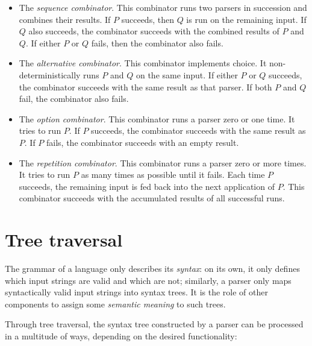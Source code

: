 \documentclass[UdineBachThesis,american,11pt]{PhdThesis}
\begin{document}
  \begin{itemize}
    \item The \emph{sequence combinator}. This combinator runs two parsers in
    succession and combines their results. If $P$ succeeds, then $Q$ is run on
    the remaining input. If $Q$ also succeeds, the combinator succeeds with the
    combined results of $P$ and $Q$\@. If either $P$ or $Q$ fails, then the
    combinator also fails.

    \item The \emph{alternative combinator}. This combinator implements choice.
    It non-deterministically runs $P$ and $Q$ on the same input. If either $P$
    or $Q$ succeeds, the combinator succeeds with the same result as that
    parser. If both $P$ and $Q$ fail, the combinator also fails.

    \item The \emph{option combinator}. This combinator runs a parser zero or
    one time. It tries to run $P$\@. If $P$ succeeds, the combinator succeeds
    with the same result as $P$\@. If $P$ fails, the combinator succeeds with an
    empty result.

    \item The \emph{repetition combinator}. This combinator runs a parser zero
    or more times. It tries to run $P$ as many times as possible until it fails.
    Each time $P$ succeeds, the remaining input is fed back into the next
    application of $P$\@. This combinator succeeds with the accumulated results
    of all successful runs.
  \end{itemize}

  \newpage

  \section{Tree traversal}

  The grammar of a language only describes its \emph{syntax}: on its own, it
  only defines which input strings are valid and which are not; similarly, a
  parser only maps syntactically valid input strings into syntax trees. It is
  the role of other components to assign some \emph{semantic meaning} to such
  trees.

  Through tree traversal, the syntax tree constructed by a parser can be
  processed in a multitude of ways, depending on the desired functionality:
\end{document}
